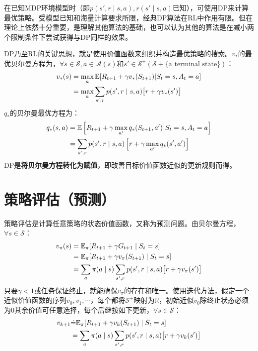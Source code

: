 \documentclass{ctexart}
\begin{document}
在已知MDP环境模型时（即$p(s',r\mid s,a),r(s'\mid s,a)$已知），可使用DP来计算最优策略。受模型已知和海量计算要求所限，经典DP算法在RL中作用有限。但在理论上依然十分重要，是理解其他算法的基础，也可以认为其他的算法是在减小两个限制条件下尝试获得与DP同样的效果。

DP乃至RL的关键思想，就是使用价值函数来组织并构造最优策略的搜索。$v_*$的最优贝尔曼方程为，$\forall s\in \mathcal S,a\in\mathcal A(s)$和$s'\in\mathcal S^+(\mathcal S+\{\text{a terminal state}\})$：
\begin{align}
v_*(s)
&= \max_a \mathbb E[R_{t+1}+\gamma v_*(S_{t+1}) | S_t=s,A_t=a] \notag\\
&= \max_a \sum_{s',r}p(s',r \mid s,a)\bigl[ r+\gamma v_*(s') \bigr]
\end{align}
$q_*$的贝尔曼最优方程为：
\begin{align}
q_*(s,a)
&= \mathbb E \left[ R_{t+1} + \gamma\max_{a'}q_*(S_{t+1},a') \middle| S_t=s,A_t=a \right] \notag\\
&= \sum_{s',r} p(s',r\mid s,a)\left[ r+\gamma\max_{a'}q_*(s',a') \right]
\end{align}
DP是\textbf{将贝尔曼方程转化为赋值}，即改善目标价值函数近似的更新规则而得。



\section{策略评估（预测）}

策略评估是计算任意策略的状态价值函数，又称为预测问题。由贝尔曼方程，$\forall s \in \mathcal S$：
\begin{align}
v_\pi(s)
&= \mathbb E_\pi[R_{t+1}+\gamma G_{t+1} \mid S_t=s] \notag \\
&= \mathbb E_\pi[R_{t+1}+\gamma v_\pi(S_{t+1}) \mid S_t=s] \\
&= \sum_a\pi(a\mid s)\sum_{s',r}p(s',r\mid s,a)\bigl[ r+\gamma v_\pi(s') \bigr]
\end{align}
只要$\gamma<1$或任务保证终止，就能确保$v_\pi$的存在和唯一。使用迭代方法，假定一个近似价值函数的序列$v_0,v_1,\cdots$，每个都将$\mathcal S^+$映射为$\mathbb R$，初始近似$v_0$除终止状态必须为0其余价值可任意选择，每个后继按如下更新，$\forall s \in \mathcal S$：
\begin{align}
v_{k+1}
&\dot= \mathbb E_\pi[R_{t+1}+\gamma v_k(S_{t+1}) \mid S_t=s] \notag\\
&= \sum_a \pi(a \mid s)\sum_{s',r}p(s',r \mid s,a)\bigl[ r+\gamma v_k(s') \bigr]
\end{align}
\end{document}
